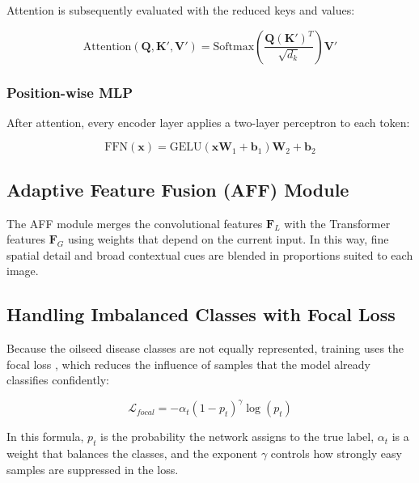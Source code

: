\documentclass[default, iicol]{sn-jnl}
\theoremstyle{thmstyleone}%
\theoremstyle{thmstyletwo}%
\theoremstyle{thmstylethree}%
\begin{document}
Attention is subsequently evaluated with the reduced keys and values:

\begin{equation}
\text{Attention}(\mathbf{Q}, \mathbf{K}', \mathbf{V}') = \text{Softmax}\left(\frac{\mathbf{Q}(\mathbf{K}')^T}{\sqrt{d_k}}\right)\mathbf{V}'
\label{eq:attention}
\end{equation}

\subsubsection{Position-wise MLP}

After attention, every encoder layer applies a two-layer perceptron to each token:

\begin{equation}
\text{FFN}(\mathbf{x}) = \text{GELU}(\mathbf{x}\mathbf{W}_1 + \mathbf{b}_1)\mathbf{W}_2 + \mathbf{b}_2
\label{eq:ffn}
\end{equation}

\subsection{Adaptive Feature Fusion (AFF) Module}

The AFF module merges the convolutional features $\mathbf{F}_L$ with the Transformer features $\mathbf{F}_G$ using weights that depend on the current input. In this way, fine spatial detail and broad contextual cues are blended in proportions suited to each image.

\subsection{Handling Imbalanced Classes with Focal Loss}

Because the oilseed disease classes are not equally represented, training uses the focal loss \cite{lin2017focal}, which reduces the influence of samples that the model already classifies confidently:

\begin{equation}
\mathcal{L}_{focal} = -\alpha_t (1-p_t)^\gamma \log(p_t)
\label{eq:focal_loss}
\end{equation}

In this formula, $p_t$ is the probability the network assigns to the true label, $\alpha_t$ is a weight that balances the classes, and the exponent $\gamma$ controls how strongly easy samples are suppressed in the loss.
\end{document}
